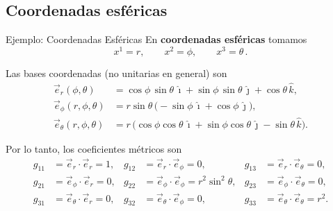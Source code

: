 \documentclass[../apunte_mecanica_clasica.tex]{subfiles}%
\begin{document}
\clearpage

\subsection{Coordenadas esféricas}

\begin{apuntebloque}{Ejemplo: Coordenadas Esféricas}
En \textbf{coordenadas esféricas} tomamos
\begin{equation*}
    x^1 = r, \qquad x^2 = \phi, \qquad x^3 = \theta \,.
\end{equation*}

Las bases coordenadas (no unitarias en general) son
\begin{align*}
    \vec{e}_r(\phi,\theta) &= \cos\phi\,\sin\theta\,\hat{\imath}
                           + \sin\phi\,\sin\theta\,\hat{\jmath}
                           + \cos\theta\,\hat{k},\\
    \vec{e}_\phi(r,\phi,\theta) &= r\sin\theta\,
        \big(-\sin\phi\,\hat{\imath}+\cos\phi\,\hat{\jmath}\big),\\
    \vec{e}_\theta(r,\phi,\theta) &= r\,
        \big(\cos\phi\cos\theta\,\hat{\imath}
            +\sin\phi\cos\theta\,\hat{\jmath}
            -\sin\theta\,\hat{k}\big).
\end{align*}

Por lo tanto, los coeficientes métricos son
\begin{align*}
    g_{11} &= \vec{e}_r\!\cdot\!\vec{e}_r = 1, &
    g_{12} &= \vec{e}_r\!\cdot\!\vec{e}_\phi = 0, &
    g_{13} &= \vec{e}_r\!\cdot\!\vec{e}_\theta = 0,\\
    g_{21} &= \vec{e}_\phi\!\cdot\!\vec{e}_r = 0, &
    g_{22} &= \vec{e}_\phi\!\cdot\!\vec{e}_\phi = r^2\sin^2\theta, &
    g_{23} &= \vec{e}_\phi\!\cdot\!\vec{e}_\theta = 0,\\
    g_{31} &= \vec{e}_\theta\!\cdot\!\vec{e}_r = 0, &
    g_{32} &= \vec{e}_\theta\!\cdot\!\vec{e}_\phi = 0, &
    g_{33} &= \vec{e}_\theta\!\cdot\!\vec{e}_\theta = r^2.
\end{align*}


\end{apuntebloque}
\end{document}
